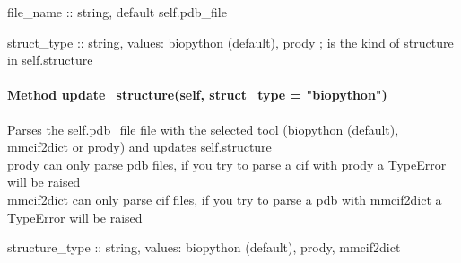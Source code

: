             file\_name :: string, default self.pdb\_file

            struct\_type :: string, values: biopython (default), prody ; is the kind of structure in self.structure
    
        \paragraph{Method update\_structure(self, struct\_type = "biopython")}
        
            Parses the self.pdb\_file file with the selected tool (biopython (default), mmcif2dict or prody) and updates self.structure\\
            prody can only parse pdb files, if you try to parse a cif with prody a TypeError will be raised\\
            mmcif2dict can only parse cif files, if you try to parse a pdb with mmcif2dict a TypeError will be raised
    
            structure\_type :: string, values: biopython (default), prody, mmcif2dict